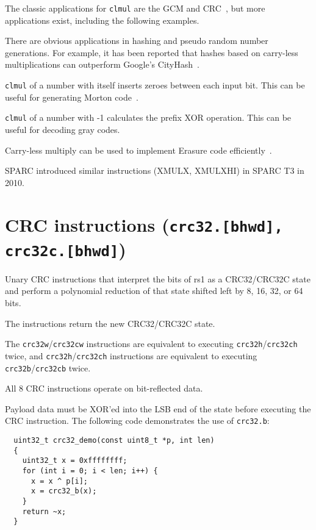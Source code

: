 

The classic applications for \texttt{clmul} are the GCM and CRC~\cite{FastCRC,Wolf18A}, but more
applications exist, including the following examples.

There are obvious applications in hashing and pseudo random number generations. For
example, it has been reported that hashes based on carry-less multiplications can
outperform Google's CityHash~\cite{CLHASH}.

\texttt{clmul} of a number with itself inserts zeroes between each input bit. This can
be useful for generating Morton code~\cite{MortonCode}.

\texttt{clmul} of a number with -1 calculates the prefix XOR operation. This can
be useful for decoding gray codes.

Carry-less multiply can be used to implement Erasure code efficiently~\cite{ClmulErasureCode}.

SPARC introduced similar instructions (XMULX, XMULXHI) in SPARC T3 in 2010.


\section{CRC instructions (\texttt{crc32.[bhwd], crc32c.[bhwd]})}

Unary CRC instructions that interpret the bits of rs1 as a CRC32/CRC32C state
and perform a polynomial reduction of that state shifted left by 8, 16, 32, or
64 bits.

The instructions return the new CRC32/CRC32C state.

The \texttt{crc32w}/\texttt{crc32cw} instructions are equivalent to executing
\texttt{crc32h}/\texttt{crc32ch} twice, and \texttt{crc32h}/\texttt{crc32ch}
instructions are equivalent to executing \texttt{crc32b}/\texttt{crc32cb}
twice.

All 8 CRC instructions operate on bit-reflected data.



Payload data must be XOR'ed into the LSB end of the state before executing the
CRC instruction. The following code demonstrates the use of \texttt{crc32.b}:

\begin{minipage}{\linewidth}
\begin{verbatim}
  uint32_t crc32_demo(const uint8_t *p, int len)
  {
    uint32_t x = 0xffffffff;
    for (int i = 0; i < len; i++) {
      x = x ^ p[i];
      x = crc32_b(x);
    }
    return ~x;
  }
\end{verbatim}
\end{minipage}

